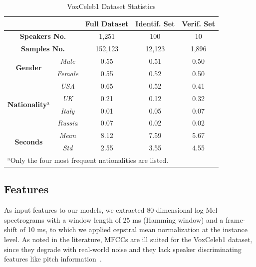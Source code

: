 \documentclass[conference]{IEEEtran}
\begin{document}
\begin{table}[htbp]
    \caption{VoxCeleb1 Dataset Statistics}
    \begin{center}
        \begin{tabular}{|c|c|c|c|c|}
        \cline{3-5}
        \multicolumn{2}{c|}{\textbf{}} & \textbf{Full Dataset} & \textbf{Identif. Set} & \textbf{Verif. Set}\\
        \hline
        \multicolumn{2}{|c|}{\textbf{Speakers No.}} & 1,251 & 100 & 10\\
        \hline
        \multicolumn{2}{|c|}{\textbf{Samples No.}} & 152,123 & 12,123 & 1,896 \\
        \hline
        \multirow{2}{*}{\textbf{Gender}} & \textit{Male} & 0.55 & 0.51 & 0.50 \\
        & \textit{Female} & 0.55 & 0.52 & 0.50 \\
        \hline
        \multirow{4}{*}{\textbf{Nationality}$^{\mathrm{a}}$} & \textit{USA} & 0.65 & 0.52 & 0.41 \\
        & \textit{UK} & 0.21 & 0.12 & 0.32 \\
        & \textit{Italy} & 0.01 & 0.05 & 0.07 \\
        & \textit{Russia} & 0.07 & 0.02 & 0.02 \\
        \hline
        \multirow{2}{*}{\textbf{Seconds}} & \textit{Mean} & 8.12 & 7.59 & 5.67 \\
        & \textit{Std} & 2.55 & 3.55 & 4.55 \\
        \hline
        \multicolumn{4}{l}{$^{\mathrm{a}}$Only the four most frequent nationalities are listed.}
        \end{tabular}
        \label{tab:dataset}
    \end{center}
\end{table}

\subsection{Features}

As input features to our models, we extracted 80-dimensional log Mel spectrograms with a window length of 25 ms (Hamming window) and a frame-shift of 10 ms, to which we applied cepstral mean normalization at the instance level. As noted in the literature, MFCCs are ill suited for the VoxCeleb1 dataset, since they degrade with real-world noise and they lack speaker discriminating features like pitch information~\cite{nagrani2020voxceleb}.
\end{document}
